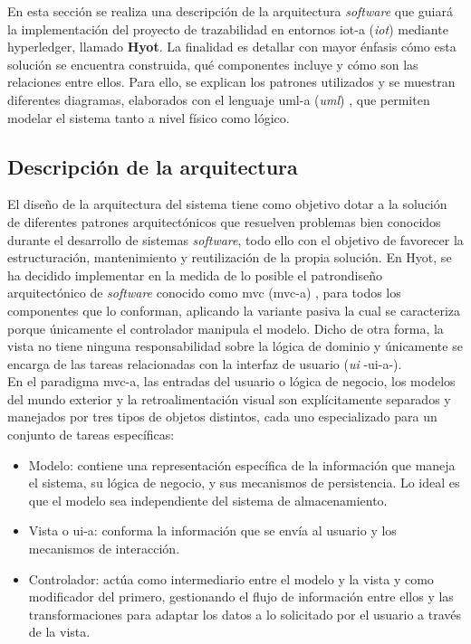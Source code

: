 \documentclass[12pt,a4paper, twoside]{report}
\begin{document}
	En esta sección se realiza una descripción de la arquitectura \textit{software} que guiará la implementación del proyecto de trazabilidad en entornos \gls{iot-a} (\textit{\gls{iot}}) mediante \gls{hyperledger}, llamado \textbf{Hyot}. La finalidad es detallar con mayor énfasis cómo esta solución se encuentra construida, qué componentes incluye y cómo son las relaciones entre ellos. Para ello, se explican los patrones utilizados y se muestran diferentes diagramas, elaborados con el lenguaje \gls{uml-a} (\textit{\gls{uml}}) \cite{uml}, que permiten modelar el sistema tanto a nivel físico como lógico.
		
	\subsection{Descripción de la arquitectura}\label{architectureDescription}
	

	El diseño de la arquitectura del sistema tiene como objetivo dotar a la solución de diferentes patrones arquitectónicos que resuelven problemas bien conocidos durante el desarrollo de sistemas \textit{software}, todo ello con el objetivo de favorecer la estructuración, mantenimiento y reutilización de la propia solución. En Hyot, se ha decidido implementar en la medida de lo posible el \gls{patrondiseño} arquitectónico de \textit{software} conocido como \gls{mvc} (\gls{mvc-a}) \cite{buschmann:mvc}, para todos los componentes que lo conforman, aplicando la variante pasiva la cual se caracteriza porque únicamente el controlador manipula el modelo. Dicho de otra forma, la vista no tiene ninguna responsabilidad sobre la lógica de dominio y únicamente se encarga de las tareas relacionadas con la interfaz de usuario (\textit{\gls{ui}} -\gls{ui-a}-). \\
	
	En el paradigma \gls{mvc-a}, las entradas del usuario o lógica de negocio, los modelos del mundo exterior y la retroalimentación visual son explícitamente separados y manejados por tres tipos de objetos distintos, cada uno especializado para un conjunto de tareas específicas:
	
	\begin{itemize}
		\item Modelo: contiene una representación específica de la información que maneja el sistema, su lógica de negocio, y sus mecanismos de persistencia. Lo ideal es que el modelo sea independiente del sistema de almacenamiento.
		\item Vista o \gls{ui-a}: conforma la información que se envía al usuario y los mecanismos de interacción.
		\item Controlador: actúa como intermediario entre el modelo y la vista y como modificador del primero, gestionando el flujo de información entre ellos y las transformaciones para adaptar los datos a lo solicitado por el usuario a través de la vista.
	\end{itemize}
\end{document}
